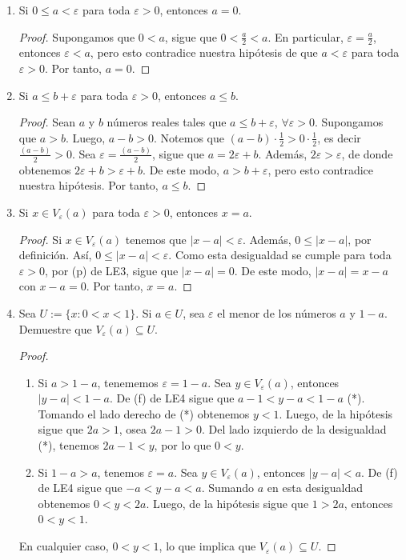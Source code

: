\documentclass[11pt]{article}
\let\epsilon\varepsilon
\begin{document}
\begin{enumerate}[label=\alph*)]
 \item Si $0 \leq a < \varepsilon$ para toda $\varepsilon > 0$, entonces $a=0$.
 
 \begin{proof} 
  Supongamos que $0<a$, sigue que $0<\frac{a}{2}<a$. En particular, $\epsilon=\frac{a}{2}$, entonces $\varepsilon<a$, pero esto contradice nuestra hipótesis de que $a< \varepsilon$ para toda $\varepsilon>0$. Por tanto, $a=0$. 
 \end{proof}

 \item Si $a \leq b + \varepsilon$ para toda $\varepsilon > 0$, entonces $a \leq b$.
 
 \begin{proof} 
  Sean $a$ y $b$ números reales tales que $a \leq b + \varepsilon$, $\forall \varepsilon > 0$. Supongamos que $a > b$. Luego, $a-b>0$. Notemos que $(a-b) \cdot \frac{1}{2} > 0 \cdot \frac{1}{2}$, es decir $\frac{(a-b)}{2} > 0$. Sea $\varepsilon = \frac{(a-b)}{2}$, sigue que $a=2\varepsilon+b$. Además, $2\varepsilon > \varepsilon$, de donde obtenemos $2 \varepsilon + b > \varepsilon + b$. De este modo, $a > b+\varepsilon$, pero esto contradice nuestra hipótesis. Por tanto, $a \leq b$. 
 \end{proof}

 \item Si $x\in V_\varepsilon(a)$ para toda $\varepsilon>0$, entonces $x=a$.
 \begin{proof} 
  Si $x\in V_\varepsilon(a)$ tenemos que $|x-a|<\varepsilon$. Además, $0\leq |x-a|$, por definición. Así, $0\leq |x-a|<\varepsilon$. Como esta desigualdad se cumple para toda $\varepsilon>0$, por (p) de LE3, sigue que $|x-a|=0$. De este modo, $|x-a|=x-a$ con $x-a=0$. Por tanto, $x=a$. 
 \end{proof}

 \item Sea $U:=\{x: 0<x<1\}$. Si $a\in U$, sea $\varepsilon$ el menor de los números $a$ y $1-a$. Demuestre que $V_\varepsilon(a) \subseteq U$.
 \begin{proof} \leavevmode
  \begin{enumerate}[label=\roman*)]
   \item Si $a>1-a$, tenememos $\varepsilon=1-a$. Sea $y\in V_\varepsilon(a)$, entonces $|y-a|<1-a$. De (f) de LE4 sigue que $a-1<y-a<1-a$ (*). Tomando el lado derecho de (*) obtenemos $y<1$. Luego, de la hipótesis sigue que $2a>1$, osea $2a-1>0$. Del lado izquierdo de la desigualdad (*), tenemos $2a-1<y$, por lo que $0<y$.
   \item Si $1-a>a$, tenemos $\varepsilon=a$. Sea $y\in V_\varepsilon(a)$, entonces $|y-a|<a$. De (f) de LE4 sigue que $-a<y-a<a$. Sumando $a$ en esta desigualdad obtenemos $0<y<2a$. Luego, de la hipótesis sigue que $1>2a$, entonces $0<y<1$.\end{enumerate}
   En cualquier caso, $0<y<1$, lo que implica que $V_\varepsilon(a) \subseteq U$. 
 \end{proof}


\end{enumerate}
\end{document}
